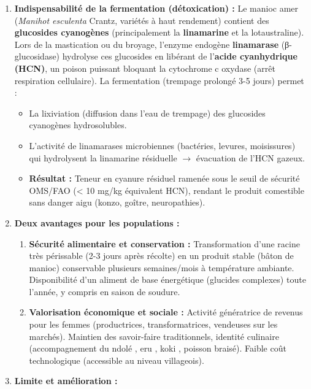 \documentclass[11pt]{article}
\begin{document}
\begin{corrige}
\begin{enumerate}
\item \textbf{Indispensabilité de la fermentation (détoxication) :} Le manioc amer (\emph{Manihot esculenta} Crantz, variétés à haut rendement) contient des \textbf{glucosides cyanogènes} (principalement la \textbf{linamarine} et la lotaustraline). Lors de la mastication ou du broyage, l'enzyme endogène \textbf{linamarase} (β-glucosidase) hydrolyse ces glucosides en libérant de l'\textbf{acide cyanhydrique (HCN)}, un poison puissant bloquant la cytochrome c oxydase (arrêt respiration cellulaire). La fermentation (trempage prolongé 3-5 jours) permet :
\begin{itemize}
\item La lixiviation (diffusion dans l'eau de trempage) des glucosides cyanogènes hydrosolubles.
\item L'activité de linamarases microbiennes (bactéries, levures, moisissures) qui hydrolysent la linamarine résiduelle $\rightarrow$ évacuation de l'HCN gazeux.
\item \textbf{Résultat :} Teneur en cyanure résiduel ramenée sous le seuil de sécurité OMS/FAO (< 10 mg/kg équivalent HCN), rendant le produit comestible sans danger aigu (konzo, goître, neuropathies).
\end{itemize}
\item \textbf{Deux avantages pour les populations :}
\begin{enumerate}
\item \textbf{Sécurité alimentaire et conservation :} Transformation d'une racine très périssable (2-3 jours après récolte) en un produit stable (bâton de manioc) conservable plusieurs semaines/mois à température ambiante. Disponibilité d'un aliment de base énergétique (glucides complexes) toute l'année, y compris en saison de soudure.
\item \textbf{Valorisation économique et sociale :} Activité génératrice de revenus pour les femmes (productrices, transformatrices, vendeuses sur les marchés). Maintien des savoir-faire traditionnels, identité culinaire (accompagnement du \og ndolé \fg{}, \og eru \fg{}, \og koki \fg{}, poisson braisé). Faible coût technologique (accessible au niveau villageois).
\end{enumerate}
\item \textbf{Limite et amélioration :}
\begin{itemize}

\end{itemize}
\end{enumerate}
\end{corrige}
\end{document}
